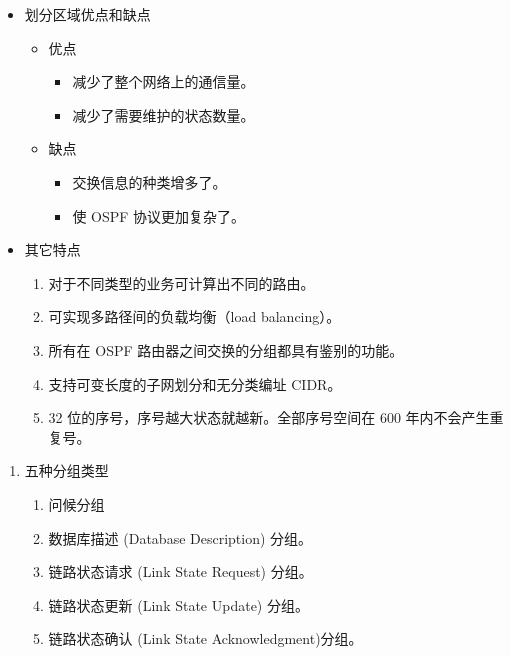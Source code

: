 \documentclass[11pt]{article}
\begin{document}
\begin{enumerate}
\begin{enumerate}
\begin{itemize}
\item 划分区域优点和缺点
\begin{itemize}
\item 优点
\begin{itemize}
\item 减少了整个网络上的通信量。
\item 减少了需要维护的状态数量。
\end{itemize}
\item 缺点
\begin{itemize}
\item 交换信息的种类增多了。
\item 使 OSPF 协议更加复杂了。
\end{itemize}
\end{itemize}
\item 其它特点
\begin{enumerate}
\item 对于不同类型的业务可计算出不同的路由。
\item 可实现多路径间的负载均衡（load balancing）。
\item 所有在 OSPF 路由器之间交换的分组都具有鉴别的功能。
\item 支持可变长度的子网划分和无分类编址 CIDR。
\item 32 位的序号，序号越大状态就越新。全部序号空间在 600 年内不会产生重复号。
\end{enumerate}
\end{itemize}

\begin{enumerate}
\item 五种分组类型
\label{sec:org5f03040}
\begin{enumerate}
\item 问候分组
\item 数据库描述 (Database Description) 分组。
\item 链路状态请求 (Link State Request) 分组。
\item 链路状态更新 (Link State Update) 分组。
\item 链路状态确认 (Link State Acknowledgment)分组。
\end{enumerate}


\end{enumerate}
\end{enumerate}
\end{enumerate}
\end{document}
